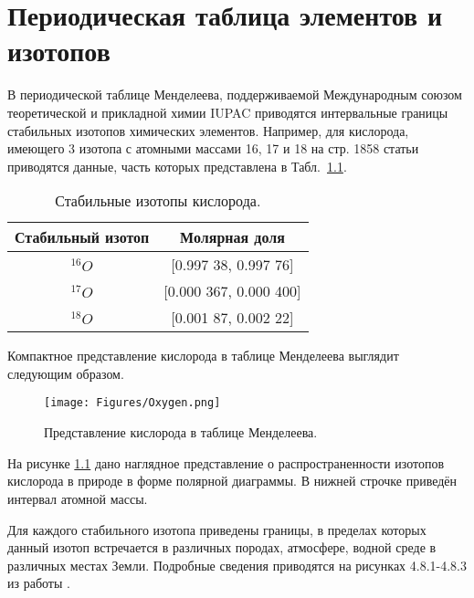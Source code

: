 \documentclass[a5paper,openany]{book}
\begin{document}
\chapter{Периодическая таблица элементов и изотопов} \label{s:IPTEI}



В периодической таблице Менделеева, поддерживаемой Международным союзом теоретической 
и прикладной химии IUPAC приводятся интервальные границы стабильных изотопов химических 
элементов. Например, для кислорода, имеющего 3 изотопа с атомными массами 16, 17 и 18 
на стр. 1858 статьи \cite{IUPAC} приводятся данные, часть которых представлена 
в Табл.~\ref{IUPACOxygen}. 


\begin{table}[h!]
	\centering
	\caption{Стабильные изотопы кислорода.} 
	\medskip 
	\begin{tabular}{|c|c|}
		\hline
		Стабильный  изотоп & Молярная доля \\
		\hline 
		$^{16}O$ & [0.997 38, 0.997 76] \\
		$^{17}O$ & [0.000 367, 0.000 400] \\
		$^{18}O$ & [0.001 87, 0.002 22] \\			
		\hline
	\end{tabular}
	\label{IUPACOxygen}
\end{table} 


Компактное представление кислорода в таблице Менделеева выглядит следующим образом.

\begin{figure}[ht] 
	\centering\small
	\texttt{[image: Figures/Oxygen.png]}
	\caption{Представление кислорода в таблице Менделеева.} 
	\label{f:Oxygen}
\end{figure}	
На рисунке \ref{f:Oxygen} дано наглядное представление о распространенности изотопов кислорода в природе в форме полярной диаграммы. В нижней строчке приведён интервал атомной массы.

Для каждого стабильного изотопа приведены границы, в пределах которых данный изотоп 
встречается в различных породах, атмосфере, водной среде в различных местах Земли. 
Подробные сведения приводятся на рисунках 4.8.1-4.8.3 из работы \cite{IUPAC}. 
\end{document}
